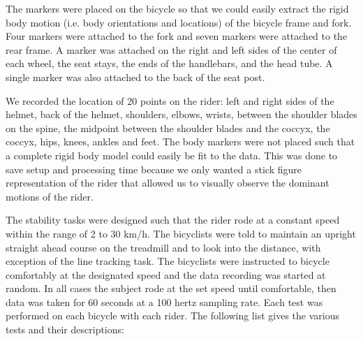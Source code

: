 The markers were placed on the bicycle so that we could easily extract the rigid body motion (i.e. body orientations and locations) of the bicycle frame and fork. Four markers were attached to the fork and seven markers were attached to the rear frame. A marker was attached on the right and left sides of the center of each wheel, the seat stays, the ends of the handlebars, and the head tube. A single marker was also attached to the back of the seat post.

We recorded the location of 20 points on the rider: left and right sides of the helmet, back of the helmet, shoulders, elbows, wrists, between the shoulder blades on the spine, the midpoint between the shoulder blades and the coccyx, the coccyx, hips, knees, ankles and feet. The body markers were not placed such that a complete rigid body model could easily be fit to the data. This was done to save setup and processing time because we only wanted a stick figure representation of the rider that allowed us to visually observe the dominant motions of the rider.

The stability tasks were designed such that the rider rode at a constant speed within the range of 2 to 30 km/h. The bicyclists were told to maintain an upright straight ahead course on the treadmill and to look into the distance, with exception of the line tracking task. The bicyclists were instructed to bicycle comfortably at the designated speed and the data recording was started at random. In all cases the subject rode at the set speed until comfortable, then data was taken for 60 seconds at a 100 hertz sampling rate. Each test was performed on each bicycle with each rider. The following list gives the various tests and their descriptions:

